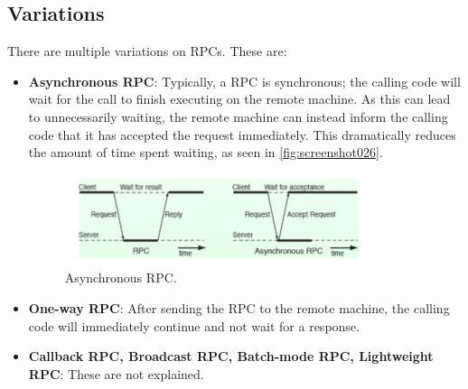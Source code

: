 \subsection{Variations}
There are multiple variations on RPCs. These are: \begin{itemize}
\item \textbf{Asynchronous RPC}: Typically, a RPC is synchronous; the calling code will wait for the call to finish executing on the remote machine. As this can lead to unnecessarily waiting, the remote machine can instead inform the calling code that it has accepted the request immediately. This dramatically reduces the amount of time spent waiting, as seen in \autoref{fig:screenshot026}. \begin{figure}
\centering
\includegraphics[width=0.7\linewidth]{screenshot026}
\caption{Asynchronous RPC.}
\label{fig:screenshot026}
\end{figure}
\item \textbf{One-way RPC}: After sending the RPC to the remote machine, the calling code will immediately continue and not wait for a response.
\item \textbf{Callback RPC, Broadcast RPC, Batch-mode RPC, Lightweight RPC}: These are not explained.
\end{itemize}

